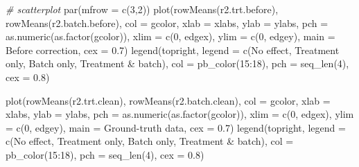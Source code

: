 \documentclass[
]{book}
\newenvironment{Shaded}{\begin{snugshade}}{\end{snugshade}}
\newcommand{\AttributeTok}[1]{\textcolor[rgb]{0.77,0.63,0.00}{#1}}
\newcommand{\CommentTok}[1]{\textcolor[rgb]{0.56,0.35,0.01}{\textit{#1}}}
\newcommand{\DecValTok}[1]{\textcolor[rgb]{0.00,0.00,0.81}{#1}}
\newcommand{\FloatTok}[1]{\textcolor[rgb]{0.00,0.00,0.81}{#1}}
\newcommand{\FunctionTok}[1]{\textcolor[rgb]{0.00,0.00,0.00}{#1}}
\newcommand{\NormalTok}[1]{#1}
\newcommand{\SpecialCharTok}[1]{\textcolor[rgb]{0.00,0.00,0.00}{#1}}
\newcommand{\StringTok}[1]{\textcolor[rgb]{0.31,0.60,0.02}{#1}}
\begin{document}
\begin{Shaded}
\begin{Highlighting}[]
\CommentTok{\# scatterplot}
\FunctionTok{par}\NormalTok{(}\AttributeTok{mfrow =} \FunctionTok{c}\NormalTok{(}\DecValTok{3}\NormalTok{,}\DecValTok{2}\NormalTok{))}
\FunctionTok{plot}\NormalTok{(}\FunctionTok{rowMeans}\NormalTok{(r2.trt.before), }\FunctionTok{rowMeans}\NormalTok{(r2.batch.before), }\AttributeTok{col =}\NormalTok{ gcolor, }
     \AttributeTok{xlab =}\NormalTok{ xlabs, }\AttributeTok{ylab =}\NormalTok{ ylabs, }\AttributeTok{pch =} \FunctionTok{as.numeric}\NormalTok{(}\FunctionTok{as.factor}\NormalTok{(gcolor)),}
     \AttributeTok{xlim =} \FunctionTok{c}\NormalTok{(}\DecValTok{0}\NormalTok{, edgex), }\AttributeTok{ylim =} \FunctionTok{c}\NormalTok{(}\DecValTok{0}\NormalTok{, edgey), }
     \AttributeTok{main =} \StringTok{\textquotesingle{}Before correction\textquotesingle{}}\NormalTok{, }\AttributeTok{cex =} \FloatTok{0.7}\NormalTok{)}
\FunctionTok{legend}\NormalTok{(}\StringTok{\textquotesingle{}topright\textquotesingle{}}\NormalTok{, }\AttributeTok{legend =} \FunctionTok{c}\NormalTok{(}\StringTok{\textquotesingle{}No effect\textquotesingle{}}\NormalTok{, }\StringTok{\textquotesingle{}Treatment only\textquotesingle{}}\NormalTok{, }
                              \StringTok{\textquotesingle{}Batch only\textquotesingle{}}\NormalTok{, }\StringTok{\textquotesingle{}Treatment \& batch\textquotesingle{}}\NormalTok{), }
       \AttributeTok{col =} \FunctionTok{pb\_color}\NormalTok{(}\DecValTok{15}\SpecialCharTok{:}\DecValTok{18}\NormalTok{), }\AttributeTok{pch =} \FunctionTok{seq\_len}\NormalTok{(}\DecValTok{4}\NormalTok{), }\AttributeTok{cex =} \FloatTok{0.8}\NormalTok{)}

\FunctionTok{plot}\NormalTok{(}\FunctionTok{rowMeans}\NormalTok{(r2.trt.clean), }\FunctionTok{rowMeans}\NormalTok{(r2.batch.clean), }\AttributeTok{col =}\NormalTok{ gcolor, }
     \AttributeTok{xlab =}\NormalTok{ xlabs, }\AttributeTok{ylab =}\NormalTok{ ylabs, }\AttributeTok{pch =} \FunctionTok{as.numeric}\NormalTok{(}\FunctionTok{as.factor}\NormalTok{(gcolor)),}
     \AttributeTok{xlim =} \FunctionTok{c}\NormalTok{(}\DecValTok{0}\NormalTok{, edgex), }\AttributeTok{ylim =} \FunctionTok{c}\NormalTok{(}\DecValTok{0}\NormalTok{, edgey), }
     \AttributeTok{main =} \StringTok{\textquotesingle{}Ground{-}truth data\textquotesingle{}}\NormalTok{, }\AttributeTok{cex =} \FloatTok{0.7}\NormalTok{)}
\FunctionTok{legend}\NormalTok{(}\StringTok{\textquotesingle{}topright\textquotesingle{}}\NormalTok{, }\AttributeTok{legend =} \FunctionTok{c}\NormalTok{(}\StringTok{\textquotesingle{}No effect\textquotesingle{}}\NormalTok{, }\StringTok{\textquotesingle{}Treatment only\textquotesingle{}}\NormalTok{, }
                              \StringTok{\textquotesingle{}Batch only\textquotesingle{}}\NormalTok{, }\StringTok{\textquotesingle{}Treatment \& batch\textquotesingle{}}\NormalTok{), }
       \AttributeTok{col =} \FunctionTok{pb\_color}\NormalTok{(}\DecValTok{15}\SpecialCharTok{:}\DecValTok{18}\NormalTok{), }\AttributeTok{pch =} \FunctionTok{seq\_len}\NormalTok{(}\DecValTok{4}\NormalTok{), }\AttributeTok{cex =} \FloatTok{0.8}\NormalTok{)}


\end{Highlighting}
\end{Shaded}
\end{document}
